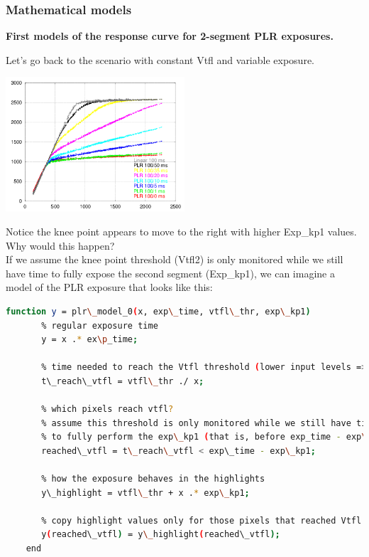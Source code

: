 \subsubsection{Mathematical models}

\textbf{First models of the response curve for 2-segment PLR exposures.}

Let's go back to the scenario with constant Vtfl and variable exposure. 

\begin{center}
\includegraphics[height=5cm]{images/100-x-32-plr-vs-30ms-lin}
\end{center}

Notice the knee point appears to move to the right with higher Exp\_kp1 values. Why would this happen?\\

If we assume the knee point threshold (Vtfl2) is only monitored while we still have time to fully expose the second segment (Exp\_kp1), we can imagine a model of the PLR exposure that looks like this:\\

\begin{lstlisting}[language=bash,morekeywords=$,keywordstyle=\bfseries,frame=none,xleftmargin=.25in,belowskip=2em, aboveskip=2em]
    function y = plr\_model_0(x, exp\_time, vtfl\_thr, exp\_kp1)
       % regular exposure time
       y = x .* ex\p_time;
       
       % time needed to reach the Vtfl threshold (lower input levels => longer times)
       t\_reach\_vtfl = vtfl\_thr ./ x;
       
       % which pixels reach vtfl?
       % assume this threshold is only monitored while we still have time
       % to fully perform the exp\_kp1 (that is, before exp_time - exp\_kp1)
       reached\_vtfl = t\_reach\_vtfl < exp\_time - exp\_kp1;
       
       % how the exposure behaves in the highlights
       y\_highlight = vtfl\_thr + x .* exp\_kp1;
       
       % copy highlight values only for those pixels that reached Vtfl
       y(reached\_vtfl) = y\_highlight(reached\_vtfl);
    end
\end{lstlisting}

